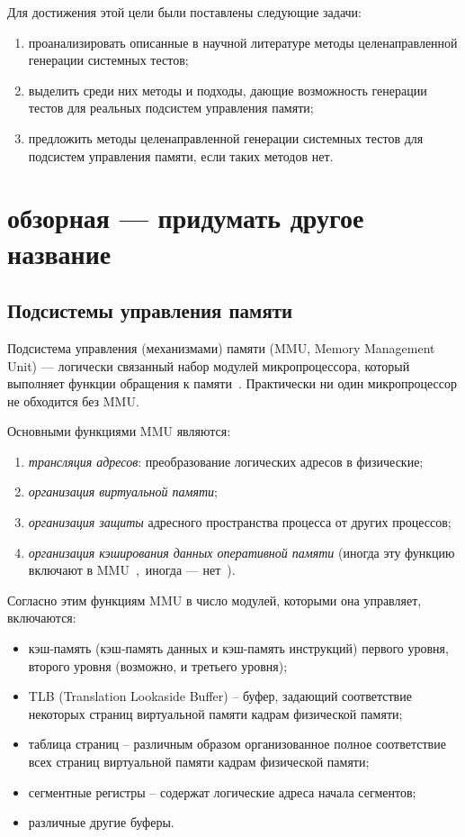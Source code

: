 \documentclass[14pt]{extreport}
\begin{document}
Для достижения этой цели были поставлены следующие задачи:
\begin{enumerate}
	\item проанализировать описанные в научной литературе методы целенаправленной генерации системных тестов;
	\item выделить среди них методы и подходы, дающие возможность генерации тестов для реальных подсистем управления памяти;
	\item предложить методы целенаправленной генерации системных тестов для подсистем управления памяти, если таких методов нет.
\end{enumerate}

\chapter{обзорная --- придумать другое название}

\section{Подсистемы управления памяти}\label{section:cache}

Подсистема управления (механизмами) памяти (MMU, Memory Management Unit) ---
логически связанный набор модулей микропроцессора, который выполняет
функции обращения к памяти~\cite{MMU}. Практически ни один
микропроцессор не обходится без MMU.

Основными функциями MMU являются:
\begin{enumerate}
  \item \emph{трансляция адресов}: преобразование логических адресов в физические;
  \item \emph{организация виртуальной памяти};
  \item \emph{организация защиты} адресного пространства процесса от других процессов;
  \item \emph{организация кэширования данных оперативной памяти} (иногда эту функцию включают в MMU~\cite{vorobyev},~иногда --- нет~\cite{thompson}).
\end{enumerate}

Согласно этим функциям MMU в число модулей, которыми она управляет, включаются:
\begin{itemize}
  \item кэш-память (кэш-память данных и кэш-память инструкций)  первого уровня, второго уровня (возможно, и третьего уровня);
  \item TLB (Translation Lookaside Buffer) -- буфер, задающий
  соответствие некоторых страниц виртуальной памяти кадрам
  физической памяти;
  \item таблица страниц -- различным образом организованное полное соответствие всех страниц виртуальной памяти кадрам физической памяти;
  \item сегментные регистры -- содержат логические адреса начала сегментов;
  \item различные другие буферы.
\end{itemize}
\end{document}
